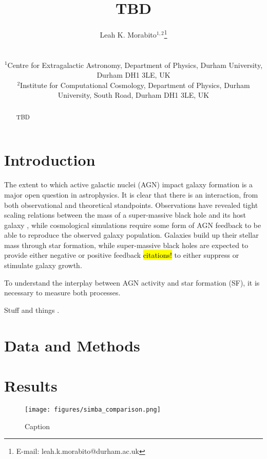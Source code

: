 \documentclass[usenatbib,fleqn]{mnras}
\title[TBD]{TBD}
\author[L.K. Morabito]{\parbox{\textwidth}{Leah K. Morabito$^{1,2}$\thanks{E-mail: leah.k.morabito@durham.ac.uk}\orcidlink{0000-0003-0487-6651}\\}\\ 
$^{1}$Centre for Extragalactic Astronomy, Department of Physics, Durham University, Durham DH1 3LE, UK \\
$^{2}$Institute for Computational Cosmology, Department of Physics, Durham University, South Road, Durham DH1 3LE, UK \\ }
\begin{document}
\date{}
\pagerange{\pageref{firstpage}--\pageref{lastpage}} 
\maketitle

\label{firstpage}


\begin{abstract}
    TBD
\end{abstract}

\section{Introduction}
\label{sec:intro}
The extent to which active galactic nuclei (AGN) impact galaxy formation is a major open question in astrophysics. It is clear that there is an interaction, from both observational and theoretical standpoints. Observations have revealed tight scaling relations between the mass of a super-massive black hole and its host galaxy \citep[see, e.g.][and references therein]{kormendy_coevolution_2013}, while cosmological simulations require some form of AGN feedback \citep{bower_breaking_2006,croton_many_2006} to be able to reproduce the observed galaxy population. Galaxies build up their stellar mass through star formation, while super-massive black holes are expected to provide either negative or positive feedback \hl{citations!} to either suppress or stimulate galaxy growth. 

To understand the interplay between AGN activity and star formation (SF), it is necessary to measure both processes. 

Stuff and things \citep{morabito_sub-arcsecond_2022}.

\section{Data and Methods}


\section{Results}

\begin{figure}
    \centering
    \texttt{[image: figures/simba\_comparison.png]}
    \caption{Caption}
    \label{fig:simba}
\end{figure}
\end{document}
